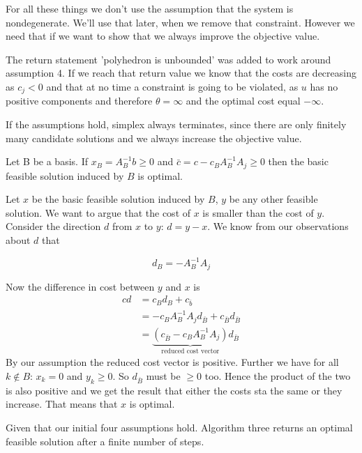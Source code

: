 For all these things we don't use the assumption that the system is nondegenerate. We'll use that later, when we remove that constraint. However we need that if we want to show that we always improve the objective value.

The return statement 'polyhedron is unbounded' was added to work around assumption 4. If we reach that return value we know that the costs are decreasing as $c_j < 0$ and that at no time a constraint is going to be violated, as $u$ has no positive components and therefore $\theta=\infty$ and the optimal cost equal $-\infty$.

If the assumptions hold, simplex always terminates, since there are only finitely many candidate solutions and we always increase the objective value.

\begin{thm}\label{Pr:simplexIIIopt} Let B be a basis. If $x_B=A^{-1}_Bb\geq 0$ and $\bar c=c- c_B A_B^{-1}A_j \geq 0$ then the basic feasible solution induced by $B$ is optimal.\end{thm}

\begin{pr} Let $x$ be the basic feasible solution induced by $B$, $y$ be any other feasible solution. We want to argue that the cost of $x$ is smaller than the cost of $y$. 
Consider the direction $d$ from $x$ to $y$: $d=y-x$. We know from our observations about $d$ that 

\[d_B = -A_{B}^{-1}A_j\]

Now the difference in cost between $y$ and $x$ is 
\begin{align*}
cd &= c_Bd_B + c_{\bar b}\\
	&= -c_BA_B^{-1}A_{j}d_{\bar B} + c_{\bar B}d_{\bar B}\\
	&= \underbrace{(c_{\bar B} - c_B A_B^{-1} A_j)}_{\text{reduced cost vector}}d_{\bar B}
\end{align*}
By our assumption the reduced cost vector is positive. Further we have for all $k\not \in B$: $x_k=0$ and $y_k\geq 0$. So $d_{\bar B}$ must be $\geq 0$ too. Hence the product of the two is also positive  and we get the result that either the costs sta the same or they increase. That means that $x$ is optimal.


\end{pr}

\begin{cor}
Given that our initial four assumptions hold. Algorithm three returns an optimal feasible solution after a finite number of steps.
\end{cor}